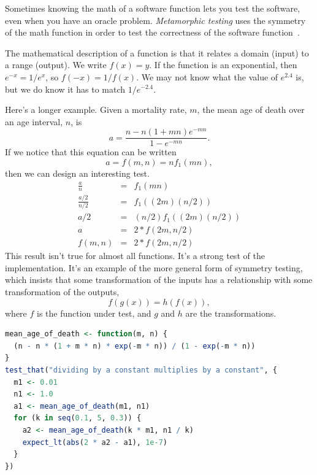 \documentclass[fleqn,10pt]{olplainarticle}
\begin{document}
Sometimes knowing the math of a software function lets you
test the software, even when you have an oracle problem.
\emph{Metamorphic testing} uses the symmetry of the math function
in order to test the correctness of the software function~\citep{ding2016,guderlei2007,kanewala2015,liu2014}.

The mathematical description of a function is that it relates
a domain (input) to a range (output). We write $f(x) = y$.
If the function is an exponential, then $e^{-x} = 1 / e^x$,
so $f(-x) = 1 / f(x)$. We may not know what the value of
$e^{2.4}$ is, but we do know it has to match $1 / e^{-2.4}$.

Here's a longer example. Given a mortality rate, $m$, the
mean age of death over an age interval, $n$, is
\begin{equation}
    a = \frac{n - n(1+m n)e^{-m n}}{1 - e^{-m n}}.
\end{equation}
If we notice that this equation can be written
\begin{equation}
    a = f(m, n) = n  f_1(m  n),
\end{equation}
then we can design an interesting test.
\begin{eqnarray}
    \frac{a}{n} &= &f_1(m  n) \\
    \frac{a/2}{n/2} &= & f_1((2  m)  (n / 2)) \\
    a /2 &= & (n/2) f_1((2  m)  (n / 2)) \\
    a &= &2 * f(2m, n/2) \\
    f(m, n) & =& 2 * f(2m, n/2)
\end{eqnarray}
This result isn't true for almost all functions. It's a strong test
of the implementation. It's an example of the more general
form of symmetry testing, which insists that some transformation
of the inputs has a relationship with some transformation of the 
outputs,
\begin{equation}
    f(g(x)) = h(f(x)),
\end{equation}
where $f$ is the function under test, and $g$ and $h$ are the transformations.

\begin{lstlisting}[language=R]
mean_age_of_death <- function(m, n) {
  (n - n * (1 + m * n) * exp(-m * n)) / (1 - exp(-m * n))
}
test_that("dividing by a constant multiplies by a constant", {
  m1 <- 0.01
  n1 <- 1.0
  a1 <- mean_age_of_death(m1, n1)
  for (k in seq(0.1, 5, 0.3)) {
    a2 <- mean_age_of_death(k * m1, n1 / k)
    expect_lt(abs(2 * a2 - a1), 1e-7)
  }
})
\end{lstlisting}
\end{document}
